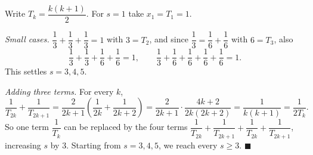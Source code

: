 Write $T_k=\dfrac{k(k+1)}{2}$. For $s=1$ take $x_1=T_1=1$.

\emph{Small cases.} $\dfrac13+\dfrac13+\dfrac13=1$ with $3=T_2$, and since $\dfrac13=\dfrac16+\dfrac16$ with $6=T_3$, also
\[\dfrac13+\dfrac13+\dfrac16+\dfrac16=1,\qquad\dfrac13+\dfrac16+\dfrac16+\dfrac16+\dfrac16=1.\]
This settles $s=3,4,5$.

\emph{Adding three terms.} For every $k$,
\[\dfrac1{T_{2k}}+\dfrac1{T_{2k+1}}=\dfrac{2}{2k+1}\left(\dfrac1{2k}+\dfrac1{2k+2}\right)=\dfrac{2}{2k+1}\cdot\dfrac{4k+2}{2k(2k+2)}=\dfrac{1}{k(k+1)}=\dfrac1{2T_k}.\]
So one term $\dfrac1{T_k}$ can be replaced by the four terms $\dfrac1{T_{2k}}+\dfrac1{T_{2k+1}}+\dfrac1{T_{2k}}+\dfrac1{T_{2k+1}}$, increasing $s$ by $3$. Starting from $s=3,4,5$, we reach every $s\ge3$. $\blacksquare$
